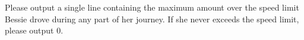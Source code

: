 Please output a single line containing the maximum amount over the speed limit Bessie drove during any part of her journey.  If she never exceeds the speed limit, please output 0.